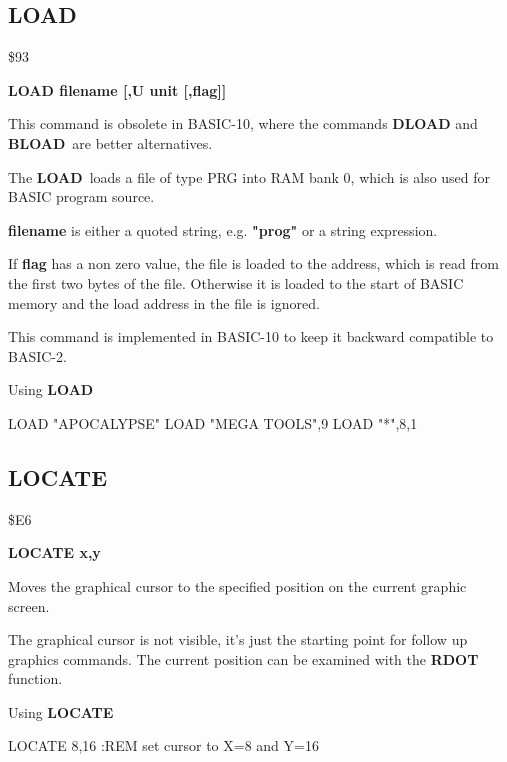 \subsection{LOAD}
\begin{description}[leftmargin=3cm,style=nextline]
\item [Token:] \$93
\item [Format:] {\bf LOAD filename [,U unit [,flag]]}
\item [Usage:]
   This command is obsolete in BASIC-10, where the commands
   {\bf DLOAD} and {\bf BLOAD} are better alternatives.

   The {\bf LOAD} loads a file of type
   PRG into RAM bank 0, which is also used for BASIC program source.

   {\bf filename} is either a quoted string, e.g. {\bf "prog"} or
   a string expression.

   \unitdefinition

   If {\bf flag} has a non zero value, the file is loaded to
   the address, which is read from the first two bytes of the file.
   Otherwise it is loaded to the start of BASIC memory and
   the load address in the file is ignored.

\item [Remarks:]
   This command is implemented in BASIC-10 to keep it backward
   compatible to BASIC-2.

\item [Example:] Using {\bf LOAD}
\begin{screenoutput}
  LOAD "APOCALYPSE"
  LOAD "MEGA TOOLS",9
  LOAD "*",8,1
\end{screenoutput}
\end{description}


\newpage
\subsection{LOCATE}
\begin{description}[leftmargin=3cm,style=nextline]
\item [Token:] \$E6
\item [Format:] {\bf LOCATE x,y}
\item [Usage:] Moves the graphical cursor to
               the specified position on the current graphic screen.

\item [Remarks:] The graphical cursor is not visible, it's just
                 the starting point for follow up graphics commands.
                 The current position can be examined with the
                 {\bf RDOT} function.
\item [Example:] Using {\bf LOCATE}
\begin{screenoutput}
 LOCATE 8,16     :REM set cursor to X=8 and Y=16
\end{screenoutput}
\end{description}

